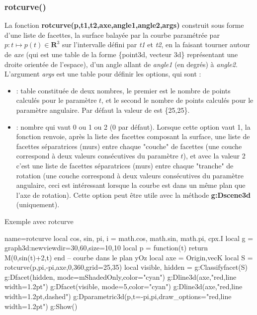 \subsubsection{rotcurve()}
La fonction \textbf{rotcurve(p,t1,t2,axe,angle1,angle2,args)} construit sous forme d'une liste de facettes, la surface balayée par la courbe paramétrée par $p\colon t\mapsto p(t)\in \mathbf R^3$ sur l'intervalle défini par \emph{t1} et \emph{t2}, en la faisant tourner autour de \emph{axe} (qui est une table de la forme \{point3d, vecteur 3d\} représentant une droite orientée de l'espace), d'un angle allant de \emph{angle1} (en degrés) à \emph{angle2}. L'argument \emph{args} est une table pour définir les options, qui sont :
    \begin{itemize}
        \item {} : table constituée de deux nombres, le premier est le nombre de points calculés pour le paramètre $t$, et le second le nombre de points calculés pour le paramètre angulaire. Par défaut la valeur de  est \{25,25\}.

        \item {} : nombre qui vaut 0 ou 1 ou 2 (0 par défaut). Lorsque cette option vaut 1, la fonction renvoie, après la liste des facettes composant la surface, une liste de facettes séparatrices (murs) entre chaque "couche" de facettes (une couche correspond à deux valeurs consécutives du paramètre $t$), et avec la valeur 2 c'est une liste de facettes séparatrices (murs) entre chaque "tranche" de rotation (une couche correspond à deux valeurs consécutives du paramètre angulaire, ceci est intéressant lorsque la courbe est dans un même plan que l'axe de rotation). Cette option peut être utile avec la méthode \textbf{g:Dscene3d} (uniquement).
        \end{itemize} 
        
\begin{demo}{Exemple avec rotcurve}
\begin{luadraw}{name=rotcurve}
local cos, sin, pi, i = math.cos, math.sin, math.pi, cpx.I
local g = graph3d:new{viewdir={30,60},size={10,10}}
local p = function(t) return M(0,sin(t)+2,t) end -- courbe dans le plan yOz
local axe = {Origin,vecK}
local S = rotcurve(p,pi,-pi,axe,0,360,{grid={25,35}})
local  visible, hidden = g:Classifyfacet(S)
g:Dfacet(hidden, {mode=mShadedOnly,color="cyan"})
g:Dline3d(axe,"red,line width=1.2pt")
g:Dfacet(visible, {mode=5,color="cyan"})
g:Dline3d(axe,"red,line width=1.2pt,dashed")
g:Dparametric3d(p,{t={-pi,pi},draw_options="red,line width=1.2pt"})
g:Show()
\end{luadraw}
\end{demo}

